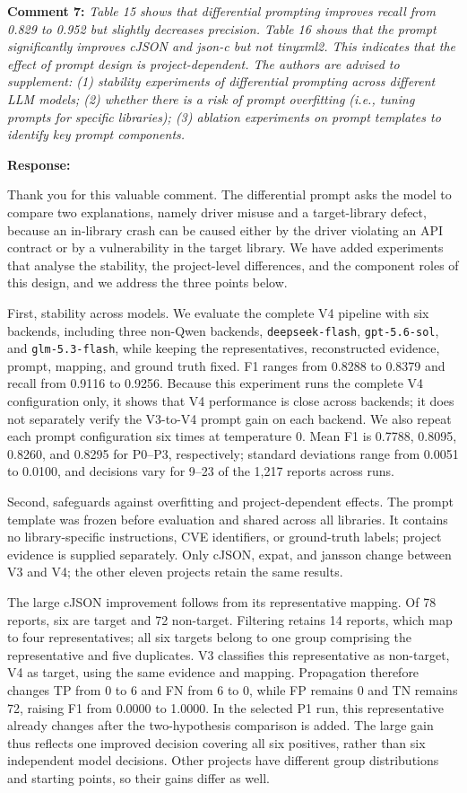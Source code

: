 \documentclass[onecolumn,11pt]{article}
\newcommand{\secc}[2]{\par\mySep \noindent \textsf{\textbf{#1 }}\textit{#2}\par}
\newcommand{\secr}[2]{\par\mySep \noindent \textsf{\textbf{#1 }}{#2}\par}
\newcommand{\mySep}{\vspace{8pt}}
\begin{document}
\secc{Comment 7:}{Table 15 shows that differential prompting improves recall from 0.829 to 0.952 but slightly decreases precision. Table 16 shows that the prompt significantly improves cJSON and json-c but not tinyxml2. This indicates that the effect of prompt design is project-dependent. The authors are advised to supplement: (1) stability experiments of differential prompting across different LLM models; (2) whether there is a risk of prompt overfitting (i.e., tuning prompts for specific libraries); (3) ablation experiments on prompt templates to identify key prompt components.}
\secr{Response:}{Thank you for this valuable comment. The differential prompt asks the model to compare two explanations, namely driver misuse and a target-library defect, because an in-library crash can be caused either by the driver violating an API contract or by a vulnerability in the target library. We have added experiments that analyse the stability, the project-level differences, and the component roles of this design, and we address the three points below.

First, stability across models. We evaluate the complete V4 pipeline with six backends, including three non-Qwen backends, \texttt{deepseek-flash}, \texttt{gpt-5.6-sol}, and \texttt{glm-5.3-flash}, while keeping the representatives, reconstructed evidence, prompt, mapping, and ground truth fixed. F1 ranges from 0.8288 to 0.8379 and recall from 0.9116 to 0.9256. Because this experiment runs the complete V4 configuration only, it shows that V4 performance is close across backends; it does not separately verify the V3-to-V4 prompt gain on each backend. We also repeat each prompt configuration six times at temperature 0. Mean F1 is 0.7788, 0.8095, 0.8260, and 0.8295 for P0--P3, respectively; standard deviations range from 0.0051 to 0.0100, and decisions vary for 9--23 of the 1,217 reports across runs.

Second, safeguards against overfitting and project-dependent effects. The prompt template was frozen before evaluation and shared across all libraries. It contains no library-specific instructions, CVE identifiers, or ground-truth labels; project evidence is supplied separately. Only cJSON, expat, and jansson change between V3 and V4; the other eleven projects retain the same results.

The large cJSON improvement follows from its representative mapping. Of 78 reports, six are target and 72 non-target. Filtering retains 14 reports, which map to four representatives; all six targets belong to one group comprising the representative and five duplicates. V3 classifies this representative as non-target, V4 as target, using the same evidence and mapping. Propagation therefore changes TP from 0 to 6 and FN from 6 to 0, while FP remains 0 and TN remains 72, raising F1 from 0.0000 to 1.0000. In the selected P1 run, this representative already changes after the two-hypothesis comparison is added. The large gain thus reflects one improved decision covering all six positives, rather than six independent model decisions. Other projects have different group distributions and starting points, so their gains differ as well.

}
\end{document}
